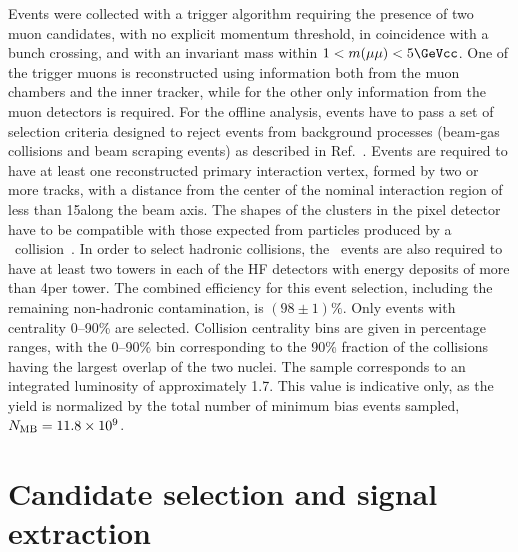 \documentclass[11pt,twoside,a4paper,cmspaper]{cms-tdr}
\begin{document}
Events were collected with a trigger algorithm requiring the presence of two muon candidates, with no explicit momentum threshold, in coincidence with a bunch crossing, and with an invariant mass within $1<m(\mu\mu)<5 \GeVcc$. One of the trigger muons is reconstructed using information both from the muon chambers and the inner tracker, while for the other only information from the muon detectors is required.  
%
For the offline analysis, events have to pass a set of selection criteria designed to reject events from background processes (beam-gas collisions and beam scraping events) as described in Ref.~\cite{Khachatryan:2016odn}. Events are required to have at least one reconstructed primary interaction vertex, formed by two or more tracks, with a distance from the center of the nominal interaction region of less than 15\cm along the beam axis. The shapes of the clusters in the pixel detector have to be compatible with those expected from particles produced by a \PbPb\ collision~\cite{Khachatryan:2010xs}. In order to select hadronic collisions, the \PbPb\ events are also required to have at least two towers in each of the HF detectors with energy deposits of more than 4\GeV per tower. The combined efficiency for this event selection, including the remaining non-hadronic contamination, is $(98\pm1)\%$. 
Only events with centrality 0--90\% are selected. Collision centrality bins are given in percentage ranges,
with the 0--90\% bin corresponding to the 90\% fraction of the collisions having the largest overlap of the two nuclei. 
The \PbPb sample corresponds to an integrated luminosity of approximately 1.7\nbinv.
This value is indicative only, as the \PbPb yield is normalized by the total number of minimum bias events sampled, $N_{\text{MB}} = 11.8 \times 10^9$. 

\section{Candidate selection and signal extraction}
\label{sec:sel}
\end{document}
